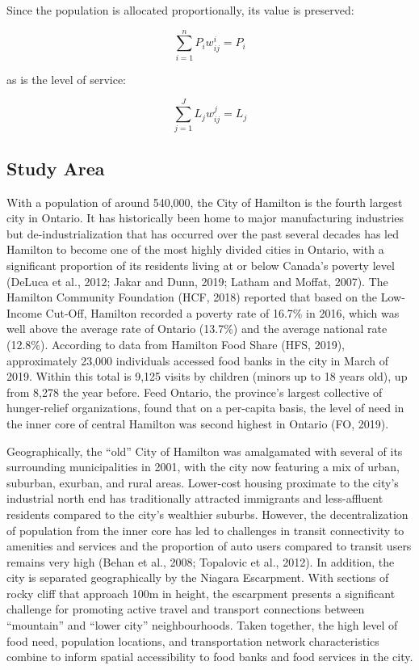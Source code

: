 \documentclass[]{elsarticle} %
\begin{document}
Since the population is allocated proportionally, its value is
preserved:

\[
\sum_{i=1}^nP_iw_{ij}^i=P_i
\]

\noindent as is the level of service:

\[
\sum_{j=1}^JL_jw_{ij}^j=L_j
\]

\hypertarget{study-area}{%
\subsection{Study Area}\label{study-area}}

With a population of around 540,000, the City of Hamilton is the fourth
largest city in Ontario. It has historically been home to major
manufacturing industries but de-industrialization that has occurred over
the past several decades has led Hamilton to become one of the most
highly divided cities in Ontario, with a significant proportion of its
residents living at or below Canada's poverty level (DeLuca et al.,
2012; Jakar and Dunn, 2019; Latham and Moffat, 2007). The Hamilton
Community Foundation (HCF, 2018) reported that based on the Low-Income
Cut-Off, Hamilton recorded a poverty rate of 16.7\% in 2016, which was
well above the average rate of Ontario (13.7\%) and the average national
rate (12.8\%). According to data from Hamilton Food Share (HFS, 2019),
approximately 23,000 individuals accessed food banks in the city in
March of 2019. Within this total is 9,125 visits by children (minors up
to 18 years old), up from 8,278 the year before. Feed Ontario, the
province's largest collective of hunger-relief organizations, found that
on a per-capita basis, the level of need in the inner core of central
Hamilton was second highest in Ontario (FO, 2019).

Geographically, the ``old'' City of Hamilton was amalgamated with
several of its surrounding municipalities in 2001, with the city now
featuring a mix of urban, suburban, exurban, and rural areas. Lower-cost
housing proximate to the city's industrial north end has traditionally
attracted immigrants and less-affluent residents compared to the city's
wealthier suburbs. However, the decentralization of population from the
inner core has led to challenges in transit connectivity to amenities
and services and the proportion of auto users compared to transit users
remains very high (Behan et al., 2008; Topalovic et al., 2012). In
addition, the city is separated geographically by the Niagara
Escarpment. With sections of rocky cliff that approach 100m in height,
the escarpment presents a significant challenge for promoting active
travel and transport connections between ``mountain'' and ``lower city''
neighbourhoods. Taken together, the high level of food need, population
locations, and transportation network characteristics combine to inform
spatial accessibility to food banks and food services in the city.
\end{document}
